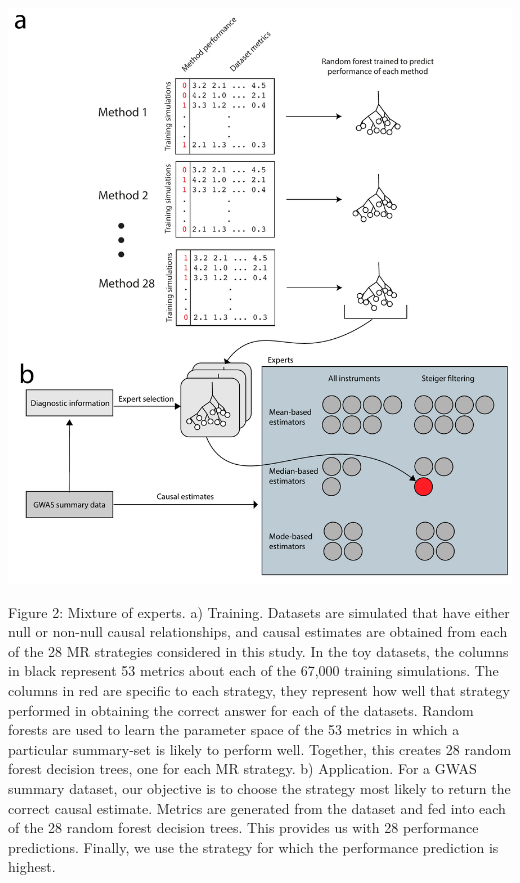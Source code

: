 \documentclass[]{article}
\begin{document}
\includegraphics{images/fig2.pdf}

Figure 2: Mixture of experts. a) Training. Datasets are simulated that
have either null or non-null causal relationships, and causal estimates
are obtained from each of the 28 MR strategies considered in this study.
In the toy datasets, the columns in black represent 53 metrics about
each of the 67,000 training simulations. The columns in red are specific
to each strategy, they represent how well that strategy performed in
obtaining the correct answer for each of the datasets. Random forests
are used to learn the parameter space of the 53 metrics in which a
particular summary-set is likely to perform well. Together, this creates
28 random forest decision trees, one for each MR strategy. b)
Application. For a GWAS summary dataset, our objective is to choose the
strategy most likely to return the correct causal estimate. Metrics are
generated from the dataset and fed into each of the 28 random forest
decision trees. This provides us with 28 performance predictions.
Finally, we use the strategy for which the performance prediction is
highest.

\newpage
\end{document}
